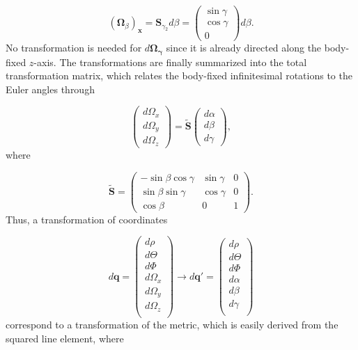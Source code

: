 \begin{equation}
(\mathbf{\Omega}_{\beta})_{\mathbf{x}} = \mathbf{S}_{\gamma_2} d\beta= 
\begin{pmatrix}
\sin\gamma \\
\cos\gamma \\
0
\end{pmatrix} d\beta.
\end{equation}
No transformation is needed for $d\mathbf{\Omega_{\gamma}}$ since it is already directed along the body-fixed $z$-axis. The transformations are finally summarized into the total transformation matrix, which relates the body-fixed infinitesimal rotations to the Euler angles through

\begin{equation}
\begin{pmatrix}
d\Omega_x\\
d\Omega_y\\
d\Omega_z
\end{pmatrix}
=
\tilde{\mathbf{S}}\begin{pmatrix}
d\alpha\\
d\beta\\
d\gamma
\end{pmatrix},
\end{equation}
where

\begin{equation}\label{eq:S_matrix}
\tilde{\mathbf{S}}=
\begin{pmatrix}
-\sin\beta\cos\gamma & \sin\gamma & 0\\
\sin\beta\sin\gamma  & \cos\gamma & 0\\
\cos\beta 			 & 0          & 1
\end{pmatrix}.
\end{equation}
Thus, a transformation of coordinates

\begin{equation}
d\mathbf{q} =
\begin{pmatrix}
d\rho\\
d\Theta\\
d\Phi\\
d\Omega_x\\
d\Omega_y\\
d\Omega_z\\
\end{pmatrix}
\longrightarrow
d\mathbf{q}' =
\begin{pmatrix}
d\rho\\
d\Theta\\
d\Phi\\
d\alpha\\
d\beta\\
d\gamma\\
\end{pmatrix}
\end{equation}
correspond to a transformation of the metric, which is easily derived from the squared line element, where

